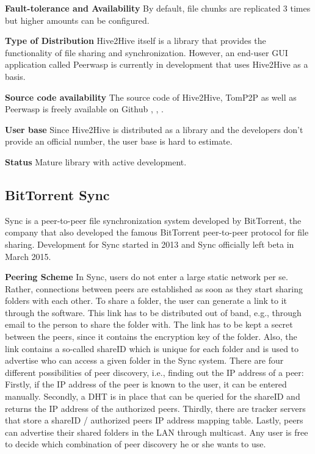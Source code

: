 \textbf{Fault-tolerance and Availability}
By default, file chunks are replicated 3 times but higher amounts can be configured.

\textbf{Type of Distribution}
Hive2Hive itself is a library that provides the functionality of file sharing and synchronization. However, an end-user GUI application called Peerwasp \cite{peerwasp} is currently in development that uses Hive2Hive as a basis.

\textbf{Source code availability}
The source code of Hive2Hive, TomP2P as well as Peerwasp is freely available on Github \cite{hive2hive:github}, \cite{tomp2p:github}, \cite{peerwasp:github}. 

\textbf{User base}
Since Hive2Hive is distributed as a library and the developers don't provide an official number, the user base is hard to estimate.

\textbf{Status}
Mature library with active development.

\subsection{BitTorrent Sync}
Sync is a peer-to-peer file synchronization system developed by BitTorrent, the company that also developed the famous BitTorrent peer-to-peer protocol for file sharing. Development for Sync started in 2013 and Sync officially left beta in March 2015.

\textbf{Peering Scheme}
In Sync, users do not enter a large static network per se. Rather, connections between peers are established as soon as they start sharing folders with each other. To share a folder, the user can generate a link to it through the software. This link has to be distributed out of band, e.g., through email to the person to share the folder with. The link has to be kept a secret between the peers, since it contains the encryption key of the folder. Also, the link contains a so-called shareID which is unique for each folder and is used to advertise who can access a given folder in the Sync system. There are four different possibilities of peer discovery, i.e., finding out the IP address of a peer: Firstly, if the IP address of the peer is known to the user, it can be entered manually. Secondly, a DHT is in place that can be queried for the shareID and returns the IP address of the authorized peers. Thirdly, there are tracker servers that store a shareID / authorized peers IP address mapping table. Lastly, peers can advertise their shared folders in the LAN through multicast. Any user is free to decide which combination of peer discovery he or she wants to use.

